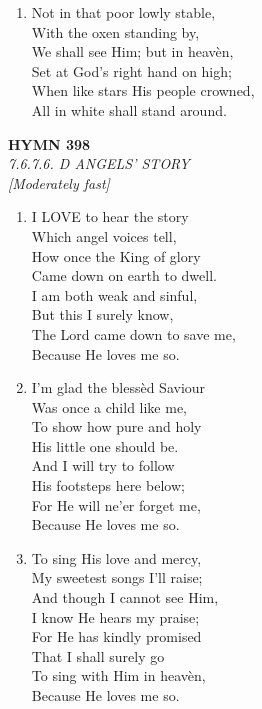 \documentclass[11pt,a4paper]{article}
\begin{document}
\begin{enumerate}
    \item Not in that poor lowly stable, \\
        With the oxen standing by, \\
        We shall see Him; but in heav\`en, \\
        Set at God's right hand on high; \\
        When like stars His people crowned, \\
        All in white shall stand around.

\end{enumerate}

\newpage
\begin{center}
    {\Large \textbf{HYMN 398}}
    \\
    \textit{7.6.7.6. D ANGELS' STORY}
    \\
    \textit{\small [Moderately fast]}
\end{center}
\vspace{1em}

\begin{enumerate}
    \item I LOVE to hear the story \\
        Which angel voices tell, \\
        How once the King of glory \\
        Came down on earth to dwell. \\
        I am both weak and sinful, \\
        But this I surely know, \\
        The Lord came down to save me, \\
        Because He loves me so.

    \item I'm glad the bless\`ed Saviour \\
        Was once a child like me, \\
        To show how pure and holy \\
        His little one should be. \\
        And I will try to follow \\
        His footsteps here below; \\
        For He will ne'er forget me, \\
        Because He loves me so.

    \item To sing His love and mercy, \\
        My sweetest songs I'll raise; \\
        And though I cannot see Him, \\
        I know He hears my praise; \\
        For He has kindly promised \\
        That I shall surely go \\
        To sing with Him in heav\`en, \\
        Because He loves me so.

\end{enumerate}
\end{document}
